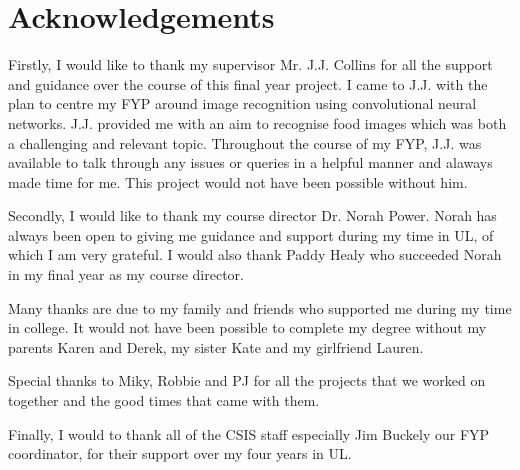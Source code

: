 \section*{Acknowledgements}
Firstly, I would like to thank my supervisor Mr. J.J. Collins for all the support and guidance over the course of this final year project.
I came to J.J. with the plan to centre my FYP around image recognition using convolutional neural networks.
J.J. provided me with an aim to recognise food images which was both a challenging and relevant topic.
Throughout the course of my FYP, J.J. was available to talk through any issues or queries in a helpful manner and alaways made time for me.
This project would not have been possible without him.

Secondly, I would like to thank my course director Dr. Norah Power.
Norah has always been open to giving me guidance and support during my time in UL, of which I am very grateful.
I would also thank Paddy Healy who succeeded Norah in my final year as my course director.

Many thanks are due to my family and friends who supported me during my time in college.
It would not have been possible to complete my degree without my parents Karen and Derek, my sister Kate and my girlfriend Lauren.

Special thanks to Miky, Robbie and PJ for all the projects that we worked on together and the good times that came with them.

Finally, I would to thank all of the CSIS staff especially Jim Buckely our FYP coordinator, for their support over my four years in UL.